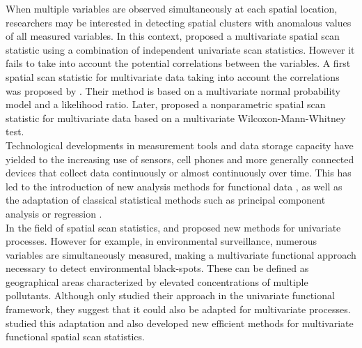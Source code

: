 \noindent When multiple variables are observed simultaneously at each spatial location, researchers may be interested in detecting spatial clusters with anomalous values of all measured variables. In this context, \citet{kulldorffmulti} proposed a multivariate spatial scan statistic using a combination of independent univariate scan statistics. However it fails to take into account the potential correlations between the variables. A first spatial scan statistic for multivariate data taking into account the correlations was proposed by \citet{a_multivariate_gaussian}. Their method is based on a multivariate normal probability model and a likelihood ratio. Later, \citet{nonparam_multi} proposed a nonparametric spatial scan statistic for multivariate data based on a multivariate Wilcoxon-Mann-Whitney test. \\ 

\noindent Technological developments in measurement tools and data storage capacity have yielded to the increasing use of sensors, cell phones and more generally connected devices that collect data continuously or almost continuously over time. 
This has led to the introduction of new analysis methods for functional data \citep{ramsaylivre}, as well as the adaptation of classical statistical methods such as principal component analysis \citep{fpc_boente, fpc_berrendero} or regression \citep{reg_cuevas, reg_ferraty, reg_chiou}. \\
\noindent In the field of spatial scan statistics, \citet{notre_fonctionnel} and \citet{wilco_cucala} proposed new methods for univariate processes. However for example, in environmental surveillance, numerous %
variables are simultaneously measured, making a multivariate functional approach necessary to detect environmental black-spots. These can be defined as geographical areas characterized by elevated concentrations of multiple pollutants. Although \citet{wilco_cucala} only studied their approach in the univariate functional framework, they suggest that it could also be adapted for multivariate processes. \citet{notre_fonctionnel1} studied this adaptation and also developed new efficient methods for multivariate functional spatial scan statistics. \\

